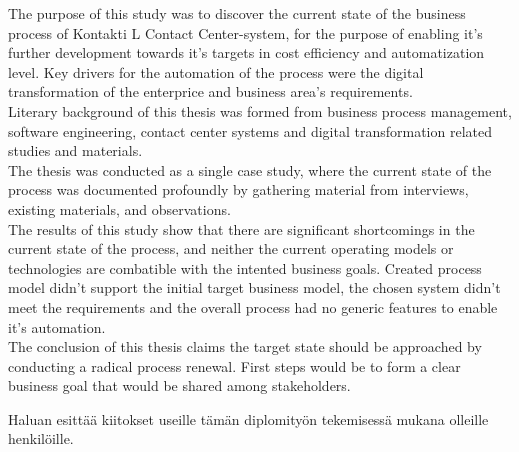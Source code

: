 \documentclass[finnish,12pt,a4paper,pdftex]{article}
\begin{document}
\newpage
%
\begin{abstractpage}[english]
The purpose of this study was to discover the current state of the business process of Kontakti L Contact Center-system, for the purpose of enabling it's further development towards it's targets in cost efficiency and automatization level. Key drivers for the automation of the process were the digital transformation of the enterprice and business area's requirements.\\

Literary background of this thesis was formed from business process management, software engineering, contact center systems and digital transformation related studies and materials. \\

The thesis was conducted as a single case study, where the current state of the process was documented profoundly by gathering material from interviews, existing materials, and observations. \\

The results of this study show that there are significant shortcomings in the current state of the process, and neither the current operating models or technologies are combatible with the intented business goals. Created process model didn't support the initial target business model, the chosen system didn't meet the requirements and the overall process had no generic features to enable it's automation.\\

The conclusion of this thesis claims the target state should be approached by conducting a radical process renewal. First steps would be to form a clear business goal that would be shared among stakeholders.
\end{abstractpage}

Haluan esittää kiitokset useille tämän diplomityön tekemisessä mukana olleille henkilöille.\\
\end{document}
